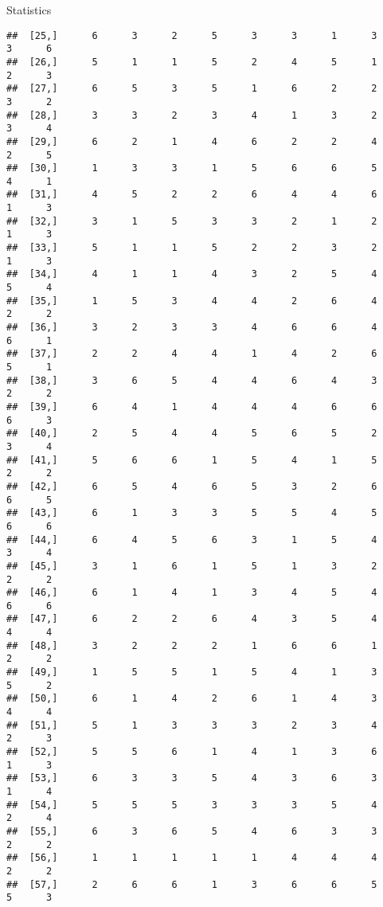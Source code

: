 \documentclass[
  ignorenonframetext,
]{beamer}
\begin{document}
\begin{frame}[fragile]{Statistics}
\begin{verbatim}
##  [25,]      6      3      2      5      3      3      1      3      3      6
##  [26,]      5      1      1      5      2      4      5      1      2      3
##  [27,]      6      5      3      5      1      6      2      2      3      2
##  [28,]      3      3      2      3      4      1      3      2      3      4
##  [29,]      6      2      1      4      6      2      2      4      2      5
##  [30,]      1      3      3      1      5      6      6      5      4      1
##  [31,]      4      5      2      2      6      4      4      6      1      3
##  [32,]      3      1      5      3      3      2      1      2      1      3
##  [33,]      5      1      1      5      2      2      3      2      1      3
##  [34,]      4      1      1      4      3      2      5      4      5      4
##  [35,]      1      5      3      4      4      2      6      4      2      2
##  [36,]      3      2      3      3      4      6      6      4      6      1
##  [37,]      2      2      4      4      1      4      2      6      5      1
##  [38,]      3      6      5      4      4      6      4      3      2      2
##  [39,]      6      4      1      4      4      4      6      6      6      3
##  [40,]      2      5      4      4      5      6      5      2      3      4
##  [41,]      5      6      6      1      5      4      1      5      2      2
##  [42,]      6      5      4      6      5      3      2      6      6      5
##  [43,]      6      1      3      3      5      5      4      5      6      6
##  [44,]      6      4      5      6      3      1      5      4      3      4
##  [45,]      3      1      6      1      5      1      3      2      2      2
##  [46,]      6      1      4      1      3      4      5      4      6      6
##  [47,]      6      2      2      6      4      3      5      4      4      4
##  [48,]      3      2      2      2      1      6      6      1      2      2
##  [49,]      1      5      5      1      5      4      1      3      5      2
##  [50,]      6      1      4      2      6      1      4      3      4      4
##  [51,]      5      1      3      3      3      2      3      4      2      3
##  [52,]      5      5      6      1      4      1      3      6      1      3
##  [53,]      6      3      3      5      4      3      6      3      1      4
##  [54,]      5      5      5      3      3      3      5      4      2      4
##  [55,]      6      3      6      5      4      6      3      3      2      2
##  [56,]      1      1      1      1      1      4      4      4      2      2
##  [57,]      2      6      6      1      3      6      6      5      5      3

\end{verbatim}
\end{frame}
\end{document}
